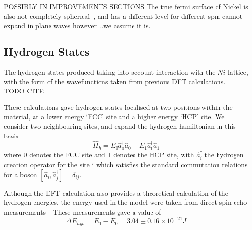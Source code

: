 POSSIBLY IN IMPROVEMENTS SECTIONS
The true fermi surface
of Nickel is also not completely
spherical~\cite{FermiSufaceNickel},
and has a different level for different spin
cannot expand in plane waves
however \ldots we assume it is.

\subsection{Hydrogen States}
The hydrogen states produced
taking into account interaction with
the \(Ni\) lattice, with the form
of the wavefunctions taken
from previous DFT calculations. TODO-CITE

These calculations gave hydrogen
states localised at two positions
within the material, at a lower energy
`FCC' site and a higher energy
`HCP' site. We consider two neighbouring
sites, and expand the hydrogen
hamiltonian in this basis
\begin{equation}
  \hat{H}_{h} =
  E_0 \hat{a}^\dagger_0 \hat{a}_0
  + E_1 \hat{a}^\dagger_1 \hat{a}_1
\end{equation}
where \(0\) denotes the FCC site and \(1\)
denotes the HCP site,
with \(\hat{a}^\dagger_i\) the hydrogen creation
operator for the site i
which satisfies the standard commutation
relations for a boson
\(\left[ \hat{a}_i, \hat{a}^\dagger_j \right]
= \delta_{ij}\).

Although the DFT calculation
also provides a theoretical calculation
of the hydrogen energies, the
energy used in the
model were
taken from direct spin-echo measurements~\cite{Jianding-Zhu}.
These measurements gave a value of
\begin{equation}
  \Delta{}E_{hyd} = E_1 - E_0
  = 3.04\pm0.16\times{}10^{-21} J
  \label{eqn:hydrogen energy difference}
\end{equation}


